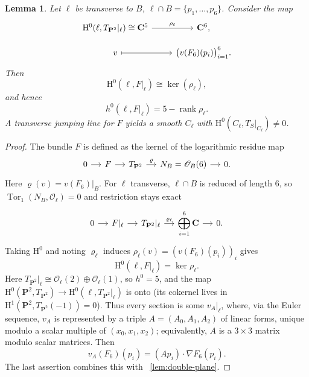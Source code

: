 \documentclass[a4paper,12pt,twoside,reqno]{amsart}
\makeatletter
\numberwithin{equation}{section}
\def\cr@pref#1:#2\@nil{#1}
\newcommand{\cr@tsing}[1]{\@nameuse{cr@map@\cr@pref#1:\@nil}}
\newcommand{\Cref}[1]{\cr@tsing{#1}~\ref{#1}}
\theoremstyle{plain}
\newtheorem{lemma}[theorem]{Lemma}
\theoremstyle{definition}
\DeclareMathOperator{\rank}{rank}
\DeclareMathOperator{\Tor}{Tor}
\newcommand{\PP}{\mathbf{P}}
\newcommand{\CC}{\mathbf{C}}
\newcommand{\Oc}{\mathscr{O}}
\newcommand{\HH}{\mathrm{H}}
\theoremstyle{plain}
\theoremstyle{definition}
\makeatother
\begin{document}
\begin{lemma}\label{lem:jump}
Let $\ell$ be transverse to $B$, $\ell\cap B=\{p_1,\dots,p_6\}$. Consider the map
\[
\begin{tikzcd}[row sep=small]
\HH^0(\ell,T_{\PP^2}|_\ell)\cong\CC^5
\arrow[r, "\rho_\ell"] & \CC^6,\\
v \arrow[r, mapsto] & \bigl(v(F_6)(p_i)\bigr)_{i=1}^6.
\end{tikzcd}
\]
Then
\[
\HH^0(\ell,F|_\ell)\cong\ker(\rho_\ell),
\]
and hence
\[
   h^0(\ell,F|_\ell)=5-\rank\rho_\ell.
\]
A transverse jumping line for $F$ yields a smooth $C_\ell$ with $\HH^0(C_\ell,T_S|_{C_\ell})\neq0$.
\end{lemma}

\begin{proof}
The bundle $F$ is defined as the kernel of the logarithmic residue map
\[
\begin{tikzcd}[column sep=small, row sep=small]
0 \arrow[r] & F \arrow[r] & T_{\PP^2} \arrow[r, "\varrho"]
& N_B=\Oc_B(6) \arrow[r] & 0.
\end{tikzcd}
\]
Here $\varrho(v)=v(F_6)|_B$.
For $\ell$ transverse, $\ell\cap B$ is reduced of length $6$, so $\Tor_1(N_B,\Oc_\ell)=0$ and restriction stays exact
\[
\begin{tikzcd}[column sep=small]
0 \arrow[r] & F|_\ell \arrow[r] & T_{\PP^2}|_\ell
\arrow[r, "\varrho_\ell"] & \displaystyle\bigoplus_{i=1}^6\CC
\arrow[r] & 0.
\end{tikzcd}
\]
Taking $\HH^0$ and noting $\varrho_\ell$ induces $\rho_\ell(v)=(v(F_6)(p_i))_i$ gives
\[
   \HH^0(\ell,F|_\ell) = \ker\rho_\ell.
\]
Here $T_{\PP^2}|_\ell\cong\Oc_\ell(2)\oplus\Oc_\ell(1)$, so $h^0=5$, and the map $\HH^0(\PP^2,T_{\PP^2})\to \HH^0(\ell,T_{\PP^2}|_\ell)$ is onto (its cokernel lives in $\HH^1(\PP^2,T_{\PP^2}(-1))=0$). Thus every section is some $v_A|_\ell$, where, via the Euler sequence, $v_A$ is represented by a triple $A=(A_0,A_1,A_2)$ of linear forms, unique modulo a scalar multiple of $(x_0,x_1,x_2)$; equivalently, $A$ is a $3\times3$ matrix modulo scalar matrices. Then
\[
   v_A(F_6)(p_i) = (Ap_i)\cdot\nabla F_6(p_i).
\] The last assertion combines this with \Cref{lem:double-plane}.
\end{proof}
\end{document}
